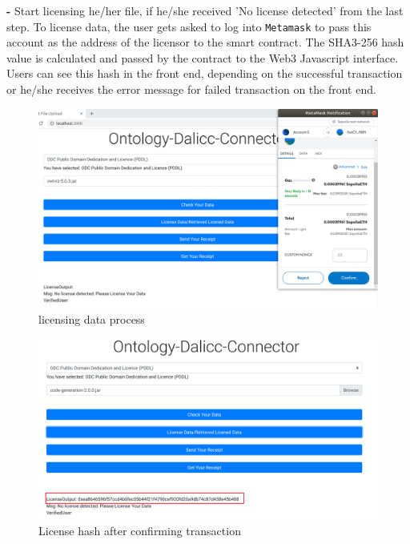 \begin{itemize}
\begin{center}
\end{center}
    \textbf{- } Start licensing he/her file, if he/she received 'No license detected'  from the last step. To license data, the user gets asked to log into \texttt{Metamask} to pass this account as the address of the licensor to the smart contract. The SHA3-256 hash value is calculated and passed by the contract to the Web3 Javascript interface. Users can see this hash in the front end, depending on the successful transaction or he/she receives the error message for failed transaction on the front end.\\
    \begin{center}
	 \begin{figure}[htb!]
		\begin{minipage}{0.45\linewidth}
			\centering
			\includegraphics[width=1.95\textwidth]{images/chap03_license_data.png}
		\end{minipage}
		\caption[licensing data process]{licensing data process}
		
	\end{figure}
\end{center}
   \begin{center}
	\begin{figure}[htb!]
		
		\begin{minipage}{0.45\linewidth}
			\centering
			\includegraphics[width=1.95\textwidth]{images/chap03_license_hash.png}
		\end{minipage}
		\caption[License hash after confirming transaction]{License hash after confirming transaction}
		

\end{figure}
\end{center}
\end{itemize}
